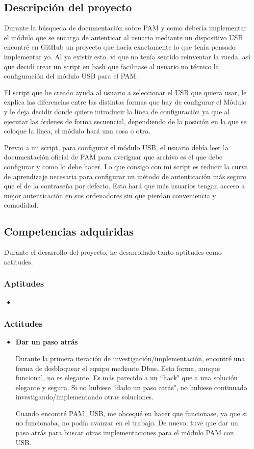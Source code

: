 \documentclass[titlepage, 12pt, a4paper]{article}
\begin{document}
\subsection{Descripción del proyecto}
Durante la búsqueda de documentación sobre \Gls{PAM} y como debería implementar el módulo que se encarga de autenticar al usuario mediante
un dispositivo \Gls{USB} encontré en \Gls{GitHub} un proyecto que hacía exactamente lo que tenía pensado implementar yo. Al ya existir esto, vi que no tenía sentido reinventar la rueda, así que decidí crear un \Gls{script} en \Gls{bash} que facilitase al usuario no técnico la configuración del módulo \Gls{USB} para el \Gls{PAM}.\par
El \Gls{script} que he creado ayuda al usuario a seleccionar el \Gls{USB} que quiera usar, le explica las diferencias entre las distintas formas que hay de configurar el Módulo y le deja decidir donde quiere introducir la línea de configuración ya que al ejecutar las órdenes de forma secuencial, dependiendo de la posición en la que se coloque la línea, el módulo hará una cosa o otra. \par
Previo a mi \Gls{script}, para configurar el módulo \Gls{USB}, el usuario debía leer la documentación oficial de PAM para averiguar que archivo es el que debe configurar y como lo debe hacer. Lo que consigo con mi \Gls{script} es reducir la curva de aprendizaje necesaria para configurar un método de autenticación más seguro que el de la contraseña por defecto. Esto hará que más usuarios tengan acceso a mejor autenticación en sus ordenadores sin que pierdan conveniencia y comodidad.
\subsection{Competencias adquiridas}
Durante el desarrollo del proyecto, he desarrollado tanto aptitudes como actitudes.
\subsubsection{Aptitudes}
\begin{itemize}
	\item{ }
\end{itemize}
\subsubsection{Actitudes}
\begin{itemize}
	\item{\textbf{Dar un paso atrás}}\par Durante la primera iteración de investigación/implementación, encontré una forma de desbloquear el equipo mediante \Gls{Dbus}. Esta forma, aunque funcional, no es elegante. Es más parecido a un ``hack" que a una solución elegante y segura. Si no hubiese ``dado un paso atrás", no hubiese continuado investigando/implementando otras soluciones. \par Cuando encontré PAM\_USB, me obcequé en hacer que funcionase, ya que si no funcionaba, no podía avanzar en el trabajo. De nuevo, tuve que dar un paso atrás para buscar otras implementaciones para el módulo \Gls{PAM} con \Gls{USB}.
\end{itemize}
\end{document}
